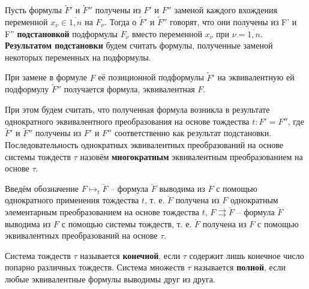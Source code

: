 \documentclass[11pt]{article}
\newcounter{th}\setcounter{th}{0}
\newcounter{stnmt}\setcounter{stnmt}{0}
\def\st{\par\smallskip\refstepcounter{stnmt}\textbf{\arabic{stnmt}}}
\newtheorem*{Statement}{Утверждение \st}
\begin{document}
Пусть формулы \(\tilde{F}'\) и \(\tilde{F}''\) получены из \(F'\) и \(F''\) заменой каждого вхождения
переменной \(x_{\nu} \in \overline{1, n}\) на \(F_{\nu}\). Тогда о \(\tilde{F}'\) и \(\tilde{F}''\)
говорят, что они получены из F' и F'' \textbf{подстановкой} подформулы \(F_{\nu}\) вместо переменной
\(x_{\nu}\) при \(\nu = \overline{1, n}\). \textbf{Результатом подстановки} будем считать формулы,
полученные заменой некоторых переменных на подформулы.
\begin{Statement}
При замене в формуле $F$ её позиционной подформулы $\tilde{F}'$ на эквивалентную ей подформулу
$\tilde{F}''$ получается формула, эквивалентная $F$.
\end{Statement}
При этом будем считать, что полученная формула возникла в результате однократного эквивалентного
преобразования на основе тождества $t: F' = F''$, где $\tilde{F}'$ и $\tilde{F}''$ получены из
$F'$ и $F''$ соответственно как результат подстановки.
Последовательность однократных эквивалентных преобразований на основе системы тождеств \(\tau\)
назовём \textbf{многократным} эквивалентным преобразованием на основе \(\tau\).

Введём обозначение \(F \mapsto_t \breve{F}\) -- формула \(\breve{F}\) выводима из \(F\) с помощью
однократного применения тождества \(t\), т. е. \(\breve{F}\) получена из \(F\) однократным
элементарным преобразованием на основе тождества \(t\), \(F \rightrightarrows \breve{F}\) --
формула \(\breve{F}\) выводима из \(F\) с помощью системы тождеств, т. е. \(\breve{F}\) получена из
\(F\) с помощью эквивалентных преобразований на основе \(\tau\).

Система тождеств \(\tau\) называется \textbf{конечной}, если \(\tau\) содержит лишь конечное число попарно
различных тождеств. Система множеств \(\tau\) называется \textbf{полной}, если любые эквивалентные формулы
выводимы друг из друга.
\end{document}
